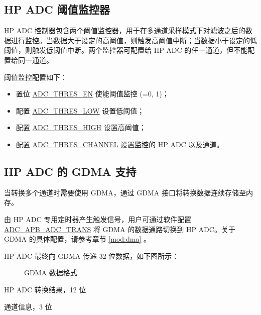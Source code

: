 \documentclass[main\_\_CN.tex]{subfiles}
\begin{document}
\subsection{HP ADC 阈值监控器}\label{sec:adc_threshold}

HP ADC 控制器包含两个阈值监控器，用于在多通道采样模式下对滤波之后的数据进行监控。当数据大于设定的高阈值，则触发高阈值中断；当数据小于设定的低阈值，则触发低阈值中断。两个监控器可配置给 HP ADC 的任一通道，但不能配置给同一通道。

阈值监控配置如下：
\begin{itemize}
    \item 置位 \hyperref[fielddesc:ADCTHRES0EN]{ADC\_THRES\_EN} 使能阈值监控  (=0, 1)；
    \item 配置 \hyperref[fielddesc:ADCTHRES0LOW]{ADC\_THRES\_LOW} 设置低阈值；
    \item 配置 \hyperref[fielddesc:ADCTHRES0LOW]{ADC\_THRES\_HIGH} 设置高阈值；
    \item 配置 \hyperref[fielddesc:ADCTHRES0CHANNEL]{ADC\_THRES\_CHANNEL} 设置监控的 HP ADC 以及通道。
\end{itemize}

\subsection{HP ADC 的 GDMA 支持}

当转换多个通道时需要使用 GDMA，通过 GDMA 接口将转换数据连续存储至内存。

由 HP ADC 专用定时器产生触发信号，用户可通过软件配置 \hyperref[fielddesc:ADCAPBADCTRANS]{ADC\_APB\_ADC\_TRANS} 将 GDMA 的数据通路切换到 HP ADC。关于 GDMA 的具体配置，请参考章节 \ref{mod:dma} \textit{}。

HP ADC 最终向 GDMA 传递 32 位数据，如下图所示：

\begin{figure}[H]
\centering
{}%
%
%
%
\end{figure}
\vspace{-2em}
\begin{figure}[H]
    \centering
    \caption{GDMA 数据格式}
    \label{fig:dma-data-format}
\end{figure}
\vspace{-2em}
\begin{regdesc}\begin{reglist}
\item [data] HP ADC 转换结果，12 位
\item [ch\_sel] 通道信息，3 位
\end{reglist}\end{regdesc}
\end{document}

